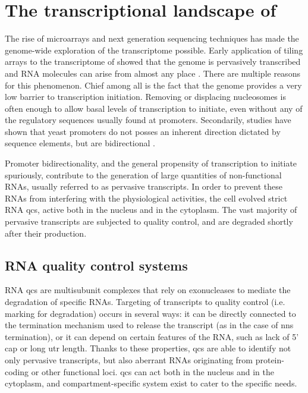 \section{The transcriptional landscape of \cer{}} %

The rise of microarrays and next generation sequencing techniques has made the genome-wide exploration of the transcriptome possible. 
Early application of tiling arrays to the transcriptome of \cer{} showed that the genome is pervasively transcribed and RNA molecules can arise from almost any place \cite{neil:2009:widespread,xu:2009:bidirectional}. 
There are multiple reasons for this phenomenon.
Chief among all is the fact that the genome provides a very low barrier to transcription initiation.
Removing or displacing nucleosomes is often enough to allow basal levels of transcription to initiate, even without any of the regulatory sequences usually found at promoters.
Secondarily, studies have shown that yeast promoters do not posses an inherent direction dictated by sequence elements, but are bidirectional \cite{neil:2009:widespread,xu:2009:bidirectional}.

Promoter bidirectionality, and the general propensity of transcription to initiate spuriously, contribute to the generation of large quantities of non-functional RNAs, usually referred to as pervasive transcripts.
In order to prevent these RNAs from interfering with the physiological activities, the cell evolved strict RNA  \gls{qcs}, active both in the nucleus and in the cytoplasm.
The vast majority of pervasive transcripts are subjected to quality control, and are degraded shortly after their production.

\subsection{RNA quality control systems}

RNA \gls{qcs} are multisubunit complexes that rely on exonucleases to mediate the degradation of specific RNAs.
Targeting of transcripts to quality control (i.e. marking for degradation) occurs in several ways: it can be directly connected to the termination mechanism used to release the transcript (as in the case of \gls{nns} termination), or it can depend on certain features of the RNA, such as lack of 5' cap or long \gls{utr} length.
Thanks to these properties, \gls{qcs} are able to identify not only pervasive transcripts, but also aberrant RNAs originating from protein-coding or other functional loci.
\gls{qcs} can act both in the nucleus and in the cytoplasm, and compartment-specific system exist to cater to the specific needs. 

